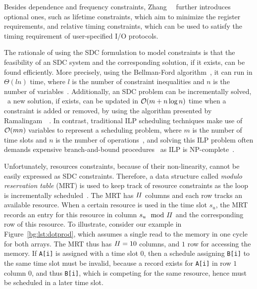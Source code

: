 Besides dependence and frequency constraints, Zhang~\etal~\cite{zhang13}
further introduces optional ones, such as lifetime constraints, which aim to
minimize the register requirements, and relative timing constraints, which can
be used to satisfy the timing requirement of user-specified I/O protocols.

The rationale of using the SDC formulation to model constraints is that
the feasibility of an SDC system and the corresponding solution, if it
exists, can be found efficiently.  More precisely, using the Bellman-Ford
algorithm~\cite{schrijver05}, it can run in $\Theta(l n)$ time, where
$l$ is the number of constraint inequalities and $n$ is the number of
variables~\cite{zhang13}.  Additionally, an SDC problem can be incrementally
solved, \ie~a new solution, if exists, can be updated in $\operatorname{\mathcal{O}}(m + n \log n)$
time when a constraint is added or removed, by using the algorithm presented by
Ramalingam~\etal~\cite{ramalingam99}.  In contrast, traditional ILP scheduling
techniques make use of $\operatorname{\mathcal{O}}(mn)$ variables to represent a scheduling
problem, where $m$ is the number of time slots and $n$ is the number of
operations~\cite{hwang91}, and solving this ILP problem often demands expensive
branch-and-bound procedures~\cite{zhang13} as ILP is NP-complete~\cite{karp10}.

Unfortunately, resources constraints, because of their non-linearity, cannot
be easily expressed as SDC constraints.  Therefore, a data structure called
\emph{modulo reservation table} (MRT) is used to keep track of resource
constraints as the loop is incrementally scheduled~\cite{canis14}.  The MRT
has $\mathit{II}$ columns and each row tracks an available resource.  When a certain
resource is used in the time slot $s_u$, the MRT records an entry for this
resource in column $s_u \mod {\mathit{II}}$ and the corresponding row of this resource.
To illustrate, consider our example in Figure~\ref{bg:lst:dotprod}, which
assumes a single read to the memory in one cycle for both arrays.  The MRT thus
has $\mathit{II} = 10$ columns, and $1$ row for accessing the memory.  If \verb|A[i]|
is assigned with a time slot $0$, then a schedule assigning \verb|B[i]| to the
same time slot must be invalid, because a record exists for \verb|A[i]| in row
$1$ column $0$, and thus \verb|B[i]|, which is competing for the same resource,
hence must be scheduled in a later time slot.

